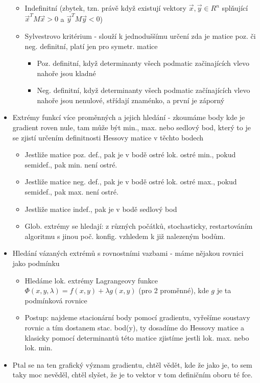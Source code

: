 \documentclass[a4paper,hidelinks]{article}
\begin{document}
\begin{itemize}
\begin{itemize}
        \item Indefinitní (zbytek, tzn. právě když existují vektory $\vec{x},\vec{y}\in R^n$ splňující $\vec{x}^TM\vec{x}>0$ a $\vec{y}^TM\vec{y}<0$)
    \end{itemize}
    \begin{itemize}
        \item Sylvestrovo kritérium - slouží k jednoduššímu určení zda je matice poz. či neg. definitní, platí jen pro symetr. matice
        \begin{itemize}
            \item Poz. definitní, když determinanty všech podmatic začinajících vlevo nahoře jsou kladné
            \item Neg. definitní, když determinanty všech podmatic začínajících vlevo nahoře jsou nenulové, střídají znaménko, a první je záporný
        \end{itemize}
    \end{itemize}
    \item Extrémy funkcí více proměnných a jejich hledání - zkoumáme body kde je gradient roven nule, tam může být min., max. nebo sedlový bod, který to je se zjistí určením definitnosti Hessovy matice v těchto bodech
    \begin{itemize}
        \item Jestliže matice poz. def., pak je v bodě ostré lok. ostré min., pokud semidef., pak min. není ostré.
        \item Jestliže matice neg. def., pak je v bodě ostré lok. ostré max., pokud semidef., pak max. není ostré.
        \item Jestliže matice indef., pak je v bodě sedlový bod
        \item Glob. extrémy se hledají: z různých počátků, stochasticky, restartováním algoritmu s jinou poč. konfig. vzhledem k již nalezeným bodům.
    \end{itemize}
    \item Hledání vázaných extrémů s rovnostními vazbami - máme nějakou rovnici jako podmínku
    \begin{itemize}
        \item Hledáme lok. extrémy Lagrangeovy funkce $\Phi(x,y,\lambda)=f(x,y)+\lambda g(x,y)$ (pro 2 proměnné), kde $g$ je ta podmínková rovnice
        \item Postup: najdeme stacionární body pomocí gradientu, vyřešíme soustavy rovnic a tím dostanem stac. bod(y), ty dosadíme do Hessovy matice a klasicky pomocí determinantů této matice zjistíme jestli lok. max. nebo lok. min.
    \end{itemize}
    \item Ptal se na ten grafický význam gradientu, chtěl vědět, kde že jako je, to sem taky moc nevěděl, chtěl slyšet, že je to vektor v tom definičním oboru té fce.
\end{itemize}
\end{document}
